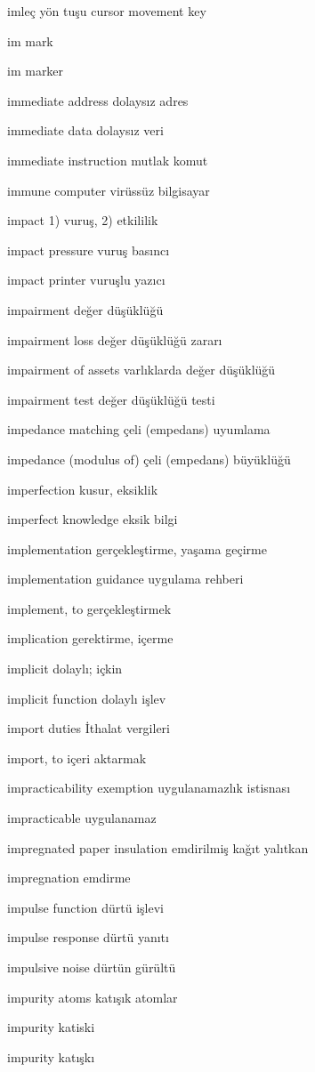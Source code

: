 \documentclass[12pt,fleqn]{article}\usepackage{../../common}
\begin{document}
imleç yön tuşu cursor movement key

im mark

im marker

immediate address dolaysız adres

immediate data dolaysız veri

immediate instruction mutlak komut

immune computer virüssüz bilgisayar

impact 1) vuruş, 2) etkililik

impact pressure vuruş basıncı

impact printer vuruşlu yazıcı

impairment değer düşüklüğü

impairment loss değer düşüklüğü zararı

impairment of assets varlıklarda değer düşüklüğü

impairment test değer düşüklüğü testi

impedance matching çeli (empedans) uyumlama

impedance (modulus of) çeli (empedans) büyüklüğü

imperfection kusur, eksiklik

imperfect knowledge eksik bilgi

implementation gerçekleştirme, yaşama geçirme

implementation guidance uygulama rehberi

implement, to gerçekleştirmek

implication gerektirme, içerme

implicit dolaylı; içkin

implicit function dolaylı işlev

import duties İthalat vergileri

import, to içeri aktarmak

impracticability exemption uygulanamazlık istisnası

impracticable uygulanamaz

impregnated paper insulation emdirilmiş kağıt yalıtkan

impregnation emdirme

impulse function dürtü işlevi

impulse response dürtü yanıtı

impulsive noise dürtün gürültü

impurity atoms katışık atomlar

impurity katiski

impurity katışkı
\end{document}
